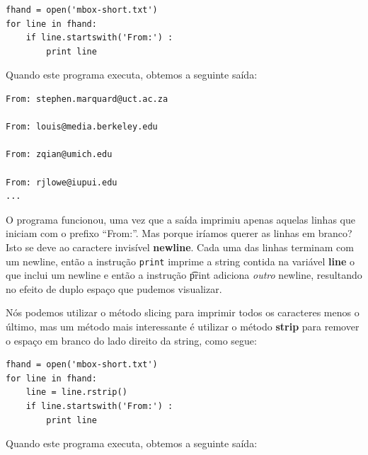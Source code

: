 \beforeverb
\begin{verbatim}
fhand = open('mbox-short.txt')
for line in fhand:
    if line.startswith('From:') :
        print line
\end{verbatim}
\afterverb

Quando este programa executa, obtemos a seguinte saída:

\beforeverb
\begin{verbatim}
From: stephen.marquard@uct.ac.za

From: louis@media.berkeley.edu

From: zqian@umich.edu

From: rjlowe@iupui.edu
...
\end{verbatim}
\afterverb

O programa funcionou, uma vez que a saída imprimiu apenas aquelas
linhas que iniciam com o prefixo ``From:''. Mas porque iríamos querer
as linhas em branco? Isto se deve ao caractere invisível {\bf newline}.
Cada uma das linhas terminam com um newline, então a instrução {\tt print}
imprime a string contida na variável {\bf line} o que inclui um newline
e então a instrução {\t print} adiciona \emph{outro} newline, resultando
no efeito de duplo espaço que pudemos visualizar.

Nós podemos utilizar o método slicing para imprimir todos os caracteres
menos o último, mas um método mais interessante é utilizar o método 
{\bf strip} para remover o espaço em branco do lado direito da string,
como segue:

\beforeverb
\begin{verbatim}
fhand = open('mbox-short.txt')
for line in fhand:
    line = line.rstrip()
    if line.startswith('From:') :
        print line
\end{verbatim}
\afterverb

Quando este programa executa, obtemos a seguinte saída:

